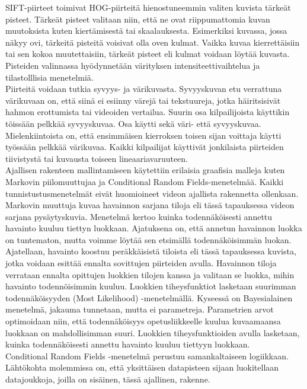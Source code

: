 SIFT-piirteet toimivat HOG-piirteitä hienostuneemmin valiten kuvista tärkeät pisteet. Tärkeät pisteet valitaan niin, että ne ovat riippumattomia
kuvan muutoksista kuten kiertämisestä tai skaalauksesta. \citep {790410} Esimerkiksi kuvassa, jossa näkyy ovi, tärkeitä pisteitä voisivat olla oven kulmat.
Vaikka kuvaa kierrettäisiin tai sen kokoa muutettaisiin, tärkeät pisteet eli kulmat voidaan löytää kuvasta.
Pisteiden valinnassa hyödynnetään värityksen intensiteettivaihtelua ja tilastolllisia menetelmiä. \\

Piirteitä voidaan tutkia syvyys- ja värikuvasta. Syvyyskuvan etu verrattuna värikuvaan on, että siinä
ei esiinny värejä tai tekstuureja, jotka häiritsisivät hahmon erottumista tai videoiden vertailua.
Suurin osa kilpailijoista käyttikin töissään pelkkää syvyyskuvaa. Osa käytti sekä väri- että syvyyskuvaa. 
Mielenkiintoista on, että ensimmäisen kierroksen toisen sijan voittaja käytti työssään pelkkää värikuvaa. 
Kaikki kilpailijat käyttivät jonkilaista piirteiden tiivistystä tai kuvausta toiseen lineaariavaruuteen.\\ 

Ajallisen rakenteen mallintamiseen käytettiin erilaisia graafisia malleja kuten Markovin piilomuuttujaa ja Conditional Random Fields-menetelmää. Kaikki tunnistustusmenetelmät eivät huomioineet videon ajallista rakennetta ollenkaan.\\

Markovin muuttuja kuvaa havainnon sarjana tiloja eli tässä tapauksessa videon sarjana pysäytyskuvia. Menetelmä kertoo kuinka todennäköisesti annettu havainto 
kuuluu tiettyn luokkaan. Ajatuksena on, että annetun havainnon luokka on tuntematon, mutta voimme löytää sen etsimällä todennäköisimmän luokan. 
Ajatellaan, havainto koostuu peräkkäisistä tiloista eli tässä tapauksessa kuvista, jotka voidaan esittää ennalta sovittujen piirteiden avulla.
Havainnon tiloja verrataan ennalta opittujen luokkien tilojen kanssa ja valitaan se luokka, mihin havainto todennöisimmin kuuluu. Luokkien tiheysfunktiot
lasketaan suurimman todennäköisyyden (Most Likelihood) -menetelmällä. Kyseessä on Bayesialainen menetelmä, jakauma tunnetaan, mutta ei parametreja.
Parametrien arvot optimoidaan niin, että todennäköisyys opetusliikkeelle kuulua kuvaamaansa luokkaan on mahdollisimman suuri. Luokkien tiheysfunktioiden
avulla lasketaan, kuinka todennäköisesti annettu havainto kuuluu tiettyyn luokkaan.\citep {}  \\

Conditional Random Fields -menetelmä perustuu samankaltaiseen logiikkaan. \citep {} Lähtökohta molemmissa on, että yksittäisen 
datapisteen sijaan luokitellaan datajoukkoja, joilla on sisäinen, tässä ajallinen, rakenne. \\

